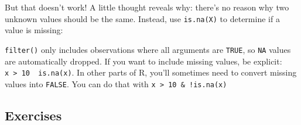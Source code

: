 But that doesn't work! A little thought reveals why: there's no reason
why two unknown values should be the same. Instead, use
\texttt{is.na(X)} to determine if a value is missing: 

\begin{Shaded}
\begin{Highlighting}[]
\end{Highlighting}
\end{Shaded}

\texttt{filter()} only includes observations where all arguments are
\texttt{TRUE}, so \texttt{NA} values are automatically dropped. If you
want to include missing values, be explicit:
\texttt{x\ \textgreater{}\ 10\ \textbar{}\ is.na(x)}. In other parts of
R, you'll sometimes need to convert missing values into \texttt{FALSE}.
You can do that with \texttt{x\ \textgreater{}\ 10\ \&\ !is.na(x)}

\subsection{Exercises}

